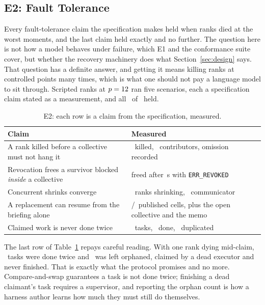 \documentclass[sigconf,nonacm]{acmart}
\newcommand{\code}[1]{\texttt{\small #1}}
\begin{document}
\subsection{E2: Fault Tolerance}
\label{sec:eval-e2}

Every fault-tolerance claim the specification makes held when ranks died at the
worst moments, and the last claim held exactly and no further. The question here
is not how a model behaves under failure, which E1 and the conformance suite
cover, but whether the recovery machinery does what Section~\ref{sec:design}
says. That question has a definite answer, and getting it means killing ranks at
controlled points many times, which is what one should not pay a language model
to sit through. Scripted ranks at $p=12$ ran five scenarios, each a
specification claim stated as a measurement, and all \eTwoUpheld\ of \eTwoTotal\
held.

\begin{table}[t]
\caption{E2: each row is a claim from the specification, measured.}
\label{tab:e2}
\small
\begin{tabular}{@{}p{3.4cm}p{4.0cm}@{}}
\toprule
Claim & Measured \\
\midrule
A rank killed before a collective must not hang it &
  \eTwoKilled\ killed, \eTwoSurvivors\ contributors, omission recorded \\
Revocation frees a survivor blocked \emph{inside} a collective &
  freed after \eTwoRevokeS\,s with \code{ERR\_REVOKED} \\
Concurrent shrinks converge &
  \eTwoShrinkers\ ranks shrinking, \eTwoComms\ communicator \\
A replacement can resume from the briefing alone &
  \eTwoRecovered/\eTwoExpected\ published cells, plus the open collective and the memo \\
Claimed work is never done twice &
  \eTwoTasks\ tasks, \eTwoCompleted\ done, \eTwoDuplicated\ duplicated \\
\bottomrule
\end{tabular}
\end{table}

The last row of Table~\ref{tab:e2} repays careful reading. With one rank dying
mid-claim, \eTwoDuplicated\ tasks were done twice and \eTwoOrphaned\ was left
orphaned, claimed by a dead executor and never finished. That is exactly what the
protocol promises and no more. Compare-and-swap guarantees a task is not done
twice; finishing a dead claimant's task requires a supervisor, and reporting the
orphan count is how a harness author learns how much they must still do
themselves.
\end{document}
